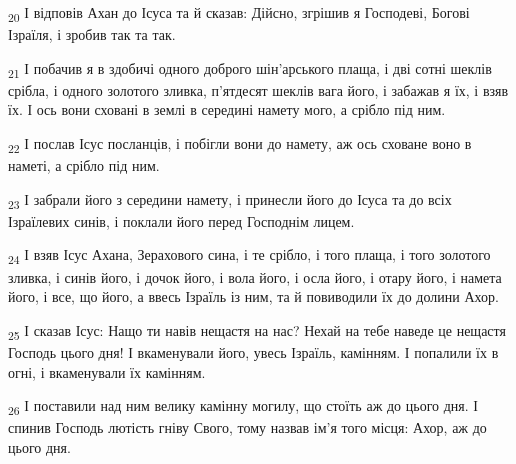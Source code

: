 \begin{tcolorbox}
\textsubscript{20} І відповів Ахан до Ісуса та й сказав: Дійсно, згрішив я Господеві, Богові Ізраїля, і зробив так та так.
\end{tcolorbox}
\begin{tcolorbox}
\textsubscript{21} І побачив я в здобичі одного доброго шін'арського плаща, і дві сотні шеклів срібла, і одного золотого зливка, п'ятдесят шеклів вага його, і забажав я їх, і взяв їх. І ось вони сховані в землі в середині намету мого, а срібло під ним.
\end{tcolorbox}
\begin{tcolorbox}
\textsubscript{22} І послав Ісус посланців, і побігли вони до намету, аж ось сховане воно в наметі, а срібло під ним.
\end{tcolorbox}
\begin{tcolorbox}
\textsubscript{23} І забрали його з середини намету, і принесли його до Ісуса та до всіх Ізраїлевих синів, і поклали його перед Господнім лицем.
\end{tcolorbox}
\begin{tcolorbox}
\textsubscript{24} І взяв Ісус Ахана, Зерахового сина, і те срібло, і того плаща, і того золотого зливка, і синів його, і дочок його, і вола його, і осла його, і отару його, і намета його, і все, що його, а ввесь Ізраїль із ним, та й повиводили їх до долини Ахор.
\end{tcolorbox}
\begin{tcolorbox}
\textsubscript{25} І сказав Ісус: Нащо ти навів нещастя на нас? Нехай на тебе наведе це нещастя Господь цього дня! І вкаменували його, увесь Ізраїль, камінням. І попалили їх в огні, і вкаменували їх камінням.
\end{tcolorbox}
\begin{tcolorbox}
\textsubscript{26} І поставили над ним велику камінну могилу, що стоїть аж до цього дня. І спинив Господь лютість гніву Свого, тому назвав ім'я того місця: Ахор, аж до цього дня.
\end{tcolorbox}

